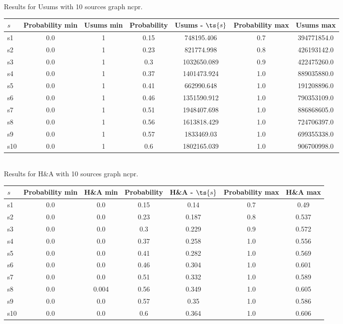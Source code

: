\documentclass{article}
\begin{document}
\noindent Results for Usums with 10 sources graph ncpr.

\noindent\begin{tabular}{|l|c|c|c|c|c|c|}
\hline
$s$& Probability min & Usums min & Probability & Usums - $\ts{s}$ & Probability max & Usums max\\
\hline
s1 &0.0 & 1 & 0.15 & 748195.406 & 0.7 & 394771854.0\\
\hline
s2 &0.0 & 1 & 0.23 & 821774.998 & 0.8 & 426193142.0\\
\hline
s3 &0.0 & 1 & 0.3 & 1032650.089 & 0.9 & 422475260.0\\
\hline
s4 &0.0 & 1 & 0.37 & 1401473.924 & 1.0 & 889035880.0\\
\hline
s5 &0.0 & 1 & 0.41 & 662990.648 & 1.0 & 191208896.0\\
\hline
s6 &0.0 & 1 & 0.46 & 1351590.912 & 1.0 & 790353109.0\\
\hline
s7 &0.0 & 1 & 0.51 & 1948407.698 & 1.0 & 886868605.0\\
\hline
s8 &0.0 & 1 & 0.56 & 1613818.429 & 1.0 & 724706397.0\\
\hline
s9 &0.0 & 1 & 0.57 & 1833469.03 & 1.0 & 699355338.0\\
\hline
s10 &0.0 & 1 & 0.6 & 1802165.039 & 1.0 & 906700998.0\\
\hline
\end{tabular}\\

\noindent Results for H\&A with 10 sources graph ncpr.

\noindent\begin{tabular}{|l|c|c|c|c|c|c|}
\hline
$s$& Probability min & H\&A min & Probability & H\&A - $\ts{s}$ & Probability max & H\&A max\\
\hline
s1 &0.0 & 0.0 & 0.15 & 0.14 & 0.7 & 0.49\\
\hline
s2 &0.0 & 0.0 & 0.23 & 0.187 & 0.8 & 0.537\\
\hline
s3 &0.0 & 0.0 & 0.3 & 0.229 & 0.9 & 0.572\\
\hline
s4 &0.0 & 0.0 & 0.37 & 0.258 & 1.0 & 0.556\\
\hline
s5 &0.0 & 0.0 & 0.41 & 0.282 & 1.0 & 0.569\\
\hline
s6 &0.0 & 0.0 & 0.46 & 0.304 & 1.0 & 0.601\\
\hline
s7 &0.0 & 0.0 & 0.51 & 0.332 & 1.0 & 0.589\\
\hline
s8 &0.0 & 0.004 & 0.56 & 0.349 & 1.0 & 0.605\\
\hline
s9 &0.0 & 0.0 & 0.57 & 0.35 & 1.0 & 0.586\\
\hline
s10 &0.0 & 0.0 & 0.6 & 0.364 & 1.0 & 0.606\\
\hline
\end{tabular}\\
\end{document}

